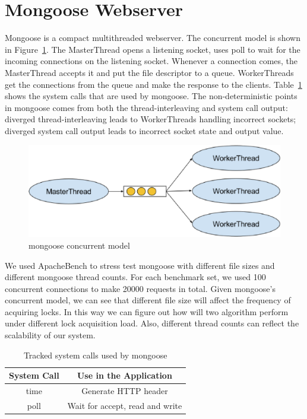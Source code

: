 \section{Mongoose Webserver}

Mongoose is a compact multithreaded webserver. The concurrent model is shown in Figure~\ref{f:mongoose_model}. The MasterThread opens a listening socket, uses poll to wait for the incoming connections on the listening socket. Whenever a connection comes, the MasterThread accepts it and put the file descriptor to a queue. WorkerThreads get the connections from the queue and make the response to the clients. Table~\ref{t:mongoose_syscall} shows the system calls that are used by mongoose. The non-deterministic points in mongoose comes from both the thread-interleaving and system call output: diverged thread-interleaving leads to WorkerThreads handling incorrect sockets; diverged system call output leads to incorrect socket state and output value.

\begin{figure}
\centering
\includegraphics[width=0.6\columnwidth]{figures/mongoose_model}
\caption{mongoose concurrent model}
\label{f:mongoose_model}
\end{figure}

We used ApacheBench to stress test mongoose with different file sizes and different mongoose thread counts. For each benchmark set, we used 100 concurrent connections to make 20000 requests in total. Given mongoose's concurrent model, we can see that different file size will affect the frequency of acquiring locks. In this way we can figure out how will two algorithm perform under different lock acquisition load. Also, different thread counts can reflect the scalability of our system.

\begin{table}
\caption{Tracked system calls used by mongoose}
\begin{center}
 \begin{tabular}{c | c}
System Call & Use in the Application\\ \hline
 time & Generate HTTP header  \\ \hline
 poll & Wait for accept, read and write
 \end{tabular}
\end{center}
\label{t:mongoose_syscall}
\end{table}

